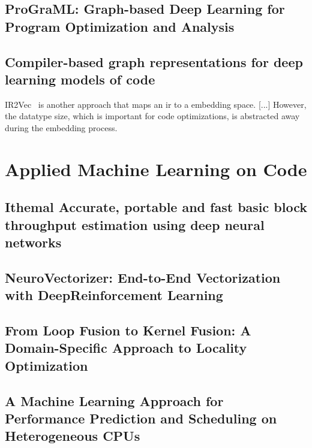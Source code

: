 \subsection*{ProGraML: Graph-based Deep Learning for Program Optimization and Analysis}\cite{cummins2020programl}

\subsection*{Compiler-based graph representations for deep learning models of code}\cite{brauckmann2020compiler}

IR2Vec~\cite{keerthy2019ir2vec} is another approach that maps an \ac{ir} to a embedding space.
[...]
However, the datatype size, which is important for code optimizations, is abstracted away during the embedding process.

\section{Applied Machine Learning on Code}
\subsection*{Ithemal Accurate, portable and fast basic block throughput estimation using deep neural networks}\cite{mendis2019ithemal}
\subsection*{NeuroVectorizer: End-to-End Vectorization with DeepReinforcement Learning}\cite{haj2020neurovectorizer}
\subsection*{From Loop Fusion to Kernel Fusion: A Domain-Specific Approach to Locality Optimization}\cite{qiao2019loop}
\subsection*{A Machine Learning Approach for Performance Prediction and Scheduling on Heterogeneous CPUs}\cite{nemirovsky2017machine}



